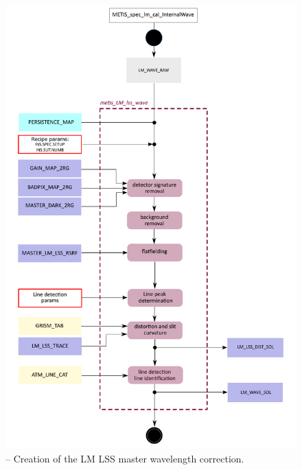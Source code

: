 \begin{figure}[ht]
  \centering
  \includegraphics[width=0.5\textheight]{figures/metis_lm_lss_wave_v0.70.pdf}
  \caption[Recipe: ]{ --
    Creation of the LM LSS master wavelength correction.}
  \label{Fig:rec_lm_lss_trace}
\end{figure}
\clearpage

